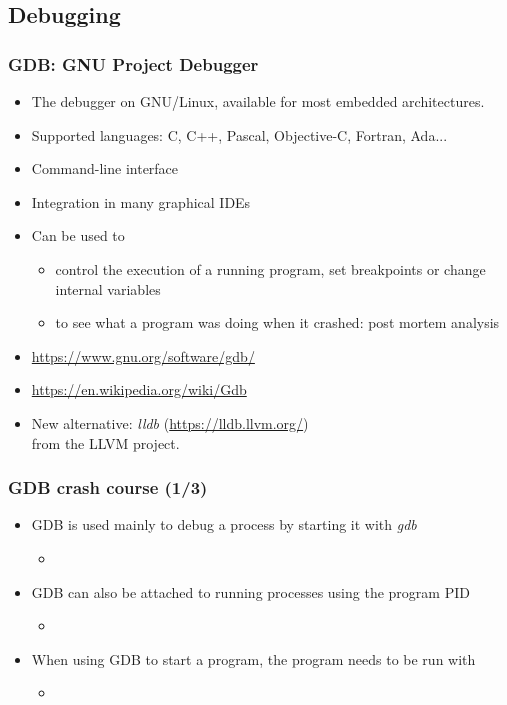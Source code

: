 \subsection{Debugging}

\begin{frame}
  \frametitle{GDB: GNU Project Debugger}
  \begin{itemize}
  \item The debugger on GNU/Linux, available for most embedded
    architectures.
  \item Supported languages: C, C++, Pascal, Objective-C, Fortran,
    Ada...
  \item Command-line interface
  \item Integration in many graphical IDEs
  \item Can be used to
    \begin{itemize}
    \item control the execution of a running program, set
    breakpoints or change internal variables
    \item to see what a program was doing when it crashed: post
    mortem analysis
    \end{itemize}
  \item \url{https://www.gnu.org/software/gdb/}
  \item \url{https://en.wikipedia.org/wiki/Gdb}
  \item New alternative: {\em lldb} (\url{https://lldb.llvm.org/})\\
    from the LLVM project.
  \end{itemize}
\end{frame}

\begin{frame}[fragile]
  \frametitle{GDB crash course (1/3)}
  \begin{itemize}
    \item GDB is used mainly to debug a process by starting it with {\em gdb}
    \begin{itemize}
      \item {}
    \end{itemize}
    \item GDB can also be attached to running processes using the program PID
    \begin{itemize}
      \item {}
    \end{itemize}
    \item When using GDB to start a program, the program needs to be run with
    \begin{itemize}
      \item {}
    \end{itemize}
  \end{itemize}
\end{frame}

